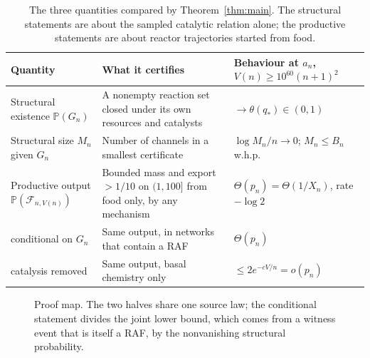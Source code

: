\documentclass[11pt,letterpaper]{article}
\theoremstyle{plain}
\theoremstyle{definition}
\theoremstyle{remark}
\numberwithin{equation}{section}
\newcommand{\PP}{\mathbb P}
\newcommand{\cF}{\mathcal F}
\newcommand{\thetaq}{\theta(q_*)}
\begin{document}
\begin{table}[ht]
\centering\small
\begin{tabular}{@{}>{\raggedright\arraybackslash}p{}>{\raggedright\arraybackslash}p{}>{\raggedright\arraybackslash}p{}@{}}
\toprule
Quantity & What it certifies & Behaviour at $a_n$, $V(n)\ge10^{60}(n+1)^2$\\
\midrule
Structural existence $\PP(G_n)$ & A nonempty reaction set closed under its own resources and catalysts & $\to\thetaq\in(0,1)$ \\[3pt]
Structural size $M_n$ given $G_n$ & Number of channels in a smallest certificate & $\log M_n/n\to0$; $M_n\le B_n$ w.h.p. \\[3pt]
Productive output $\PP(\cF_{n,V(n)})$ & Bounded mass and export $>1/10$ on $(1,100]$ from food only, by any mechanism & $\Theta(p_n)=\Theta(1/X_n)$, rate $-\log2$ \\[3pt]
\quad conditional on $G_n$ & Same output, in networks that contain a RAF & $\Theta(p_n)$ \\[3pt]
\quad catalysis removed & Same output, basal chemistry only & $\le2e^{-cV/n}=o(p_n)$ \\
\bottomrule
\end{tabular}
\caption{The three quantities compared by Theorem~\ref{thm:main}. The structural statements are about the sampled catalytic relation alone; the productive statements are about reactor trajectories started from food.}\label{tab:compare}
\end{table}

\begin{figure}[ht]
\centering
{}
\caption{Proof map. The two halves share one source law; the conditional statement divides the joint lower bound, which comes from a witness event that is itself a RAF, by the nonvanishing structural probability.}\label{fig:map}
\end{figure}
\end{document}

